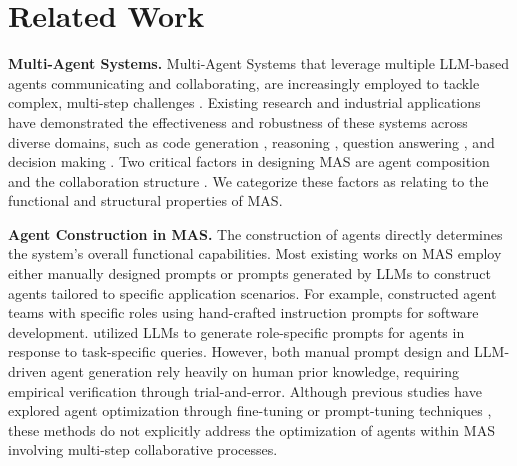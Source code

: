 

\section{Related Work}\label{sec:related}


\noindent \textbf{Multi-Agent Systems.} Multi-Agent Systems that leverage multiple LLM-based agents communicating and collaborating, are increasingly employed to tackle complex, multi-step challenges \cite{tran2025multi}. Existing research and industrial applications have demonstrated the effectiveness and robustness of these systems across diverse domains, such as code generation \cite{barbarroxa2024benchmarking}, reasoning \cite{debate1-mit}, question answering \cite{das2023enabling}, and decision making \cite{sun2024llm}. Two critical factors in designing MAS are agent composition and the collaboration structure \cite{tran2025multi}. We categorize these factors as relating to the functional and structural properties of MAS.




\noindent \textbf{Agent Construction in MAS.} 
The construction of agents directly determines the system's overall functional capabilities. 
Most existing works on MAS employ either manually designed prompts or prompts generated by LLMs to construct agents tailored to specific application scenarios. For example, \citet{das2023enabling} constructed agent teams with specific roles using hand-crafted instruction prompts for software development. \citet{multi-persona} utilized LLMs to generate role-specific prompts for agents in response to task-specific queries. However, both manual prompt design and LLM-driven agent generation rely heavily on human prior knowledge, requiring empirical verification through trial-and-error. Although previous studies have explored agent optimization through fine-tuning \cite{api_bank} or prompt-tuning techniques \cite{dsp}, these methods do not explicitly address the optimization of agents within MAS involving multi-step collaborative processes.


